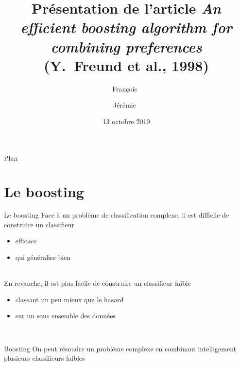 \documentclass{beamer}
\title{Présentation de l'article \emph{An efficient boosting algorithm for combining preferences} \\ 
       (Y.~Freund et al., 1998)}
\author[Rousseau, Decock]{François~\bsc{Rousseau} \and Jérémie~\bsc{Decock}}
\institute{UPMC}
\date{13 octobre 2010}
\begin{document}

\begin{frame}
    \titlepage
\end{frame}


\begin{frame}{Plan}
    \tableofcontents
\end{frame}


\section{Le boosting}

\begin{frame}{Le boosting}
    Face à un problème de classification complexe, il est difficile de
    construire un classifieur 
    \begin{itemize}
        \item efficace
        \item qui généralise bien
    \end{itemize}
    ~\\
    En revanche, il est plus facile de construire un classifieur
    \og{}faible\fg{}
    \begin{itemize}
        \item classant un peu mieux que le hasard
        \item sur un sous ensemble des données
    \end{itemize}
    ~\\
    \begin{block}{Boosting}
        On peut résoudre un problème complexe en combinant intelligement
        plusieurs classifieurs faibles
    \end{block}
\end{frame}
\end{document}
